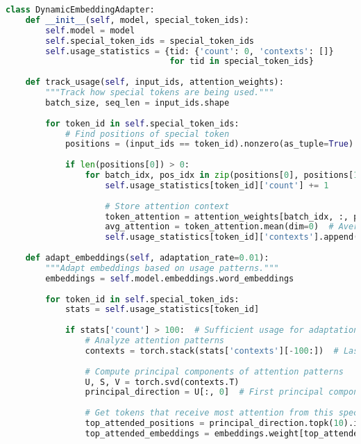\begin{lstlisting}[language=Python, caption=Dynamic adaptation of special token embeddings]
class DynamicEmbeddingAdapter:
    def __init__(self, model, special_token_ids):
        self.model = model
        self.special_token_ids = special_token_ids
        self.usage_statistics = {tid: {'count': 0, 'contexts': []} 
                                 for tid in special_token_ids}
        
    def track_usage(self, input_ids, attention_weights):
        """Track how special tokens are being used."""
        batch_size, seq_len = input_ids.shape
        
        for token_id in self.special_token_ids:
            # Find positions of special token
            positions = (input_ids == token_id).nonzero(as_tuple=True)
            
            if len(positions[0]) > 0:
                for batch_idx, pos_idx in zip(positions[0], positions[1]):
                    self.usage_statistics[token_id]['count'] += 1
                    
                    # Store attention context
                    token_attention = attention_weights[batch_idx, :, pos_idx, :]
                    avg_attention = token_attention.mean(dim=0)  # Average over heads
                    self.usage_statistics[token_id]['contexts'].append(avg_attention)
                    
    def adapt_embeddings(self, adaptation_rate=0.01):
        """Adapt embeddings based on usage patterns."""
        embeddings = self.model.embeddings.word_embeddings
        
        for token_id in self.special_token_ids:
            stats = self.usage_statistics[token_id]
            
            if stats['count'] > 100:  # Sufficient usage for adaptation
                # Analyze attention patterns
                contexts = torch.stack(stats['contexts'][-100:])  # Last 100 uses
                
                # Compute principal components of attention patterns
                U, S, V = torch.svd(contexts.T)
                principal_direction = U[:, 0]  # First principal component
                
                # Get tokens that receive most attention from this special token
                top_attended_positions = principal_direction.topk(10).indices
                top_attended_embeddings = embeddings.weight[top_attended_positions]
                

\end{lstlisting}

